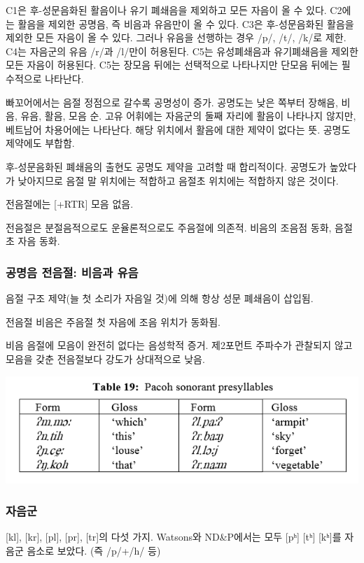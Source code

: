 C1은 후-성문음화된 활음이나 유기 폐쇄음을 제외하고 모든 자음이 올 수 있다. C2에는 활음을 제외한 공명음, 즉 비음과 유음만이 올 수 있다. C3은 후-성문음화된 활음을 제외한 모든 자음이 올 수 있다. 그러나 유음을 선행하는 경우 /p/, /t/, /k/로 제한. C4는 자음군의 유음 /r/과 /l/만이 허용된다. C5는 유성폐쇄음과 유기폐쇄음을 제외한 모든 자음이 허용된다. C5는 장모음 뒤에는 선택적으로 나타나지만 단모음 뒤에는 필수적으로 나타난다.

빠꼬어에서는 음절 정점으로 갈수록 공명성이 증가. 공명도는 낮은 쪽부터 장해음, 비음, 유음, 활음, 모음 순. 고유 어휘에는 자음군의 둘째 자리에 활음이 나타나지 않지만, 베트남어 차용어에는 나타난다. 해당 위치에서 활음에 대한 제약이 없다는 뜻. 공명도 제약에도 부합함.

후-성문음화된 폐쇄음의 출현도 공명도 제약을 고려할 때 합리적이다. 공명도가 높았다가 낮아지므로 음절 말 위치에는 적합하고 음절초 위치에는 적합하지 않은 것이다.

전음절에는 [+RTR] 모음 없음. 

전음절은 분절음적으로도 운율론적으로도 주음절에 의존적. 비음의 조음점 동화, 음절초 자음 동화.

\subsubsection{공명음 전음절: 비음과 유음}
음절 구조 제약(늘 첫 소리가 자음일 것)에 의해 항상 성문 폐쇄음이 삽입됨.

전음절 비음은 주음절 첫 자음에 조음 위치가 동화됨.

비음 음절에 모음이 완전히 없다는 음성학적 증거. 제2포먼트 주파수가 관찰되지 않고 모음을 갖춘 전음절보다 강도가 상대적으로 낮음.

\includegraphics{Pacoh/src/PacohTable19.png}

\subsubsection{자음군}
[kl], [kr], [pl], [pr], [tr]의 다섯 가지. Watsons와 ND\&P에서는 모두 [pʰ] [tʰ] [kʰ]를 자음군 음소로 보았다. (즉 /p/+/h/ 등)

